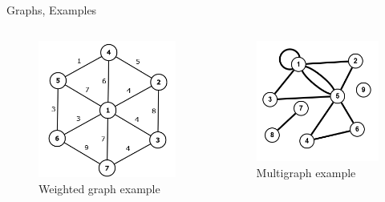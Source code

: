 \documentclass[aspectratio=169]{beamer}%
\begin{document}
\begin{frame}{Graphs, Examples}
\begin{columns}[T]
\begin{column}{.32\textwidth}
\begin{figure}
                \includegraphics[width=.9\linewidth]{graph3.png}%
                \caption{Weighted graph example}%
            \end{figure}%
        \end{column}%
        \hfill
        \begin{column}{.32\textwidth}%
            \begin{figure}%
                \centering%
                \includegraphics[width=.9\linewidth]{graph4.png}%
                \caption{Multigraph example}%
            \end{figure}%
        \end{column}%
    \end{columns}%
\end{frame}
\end{document}
